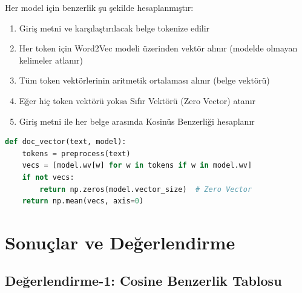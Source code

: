 \documentclass[12pt, a4paper]{article}
\begin{document}
Her model için benzerlik şu şekilde hesaplanmıştır:

\begin{enumerate}
    \item Giriş metni ve karşılaştırılacak belge tokenize edilir
    \item Her token için Word2Vec modeli üzerinden vektör alınır (modelde olmayan kelimeler atlanır)
    \item Tüm token vektörlerinin aritmetik ortalaması alınır (belge vektörü)
    \item Eğer hiç token vektörü yoksa Sıfır Vektörü (Zero Vector) atanır
    \item Giriş metni ile her belge arasında Kosinüs Benzerliği hesaplanır
\end{enumerate}

\begin{lstlisting}[style=kod, language=Python, caption={Belge Vektörü Hesaplama}]
def doc_vector(text, model):
    tokens = preprocess(text)
    vecs = [model.wv[w] for w in tokens if w in model.wv]
    if not vecs:
        return np.zeros(model.vector_size)  # Zero Vector
    return np.mean(vecs, axis=0)
\end{lstlisting}

\section{Sonuçlar ve Değerlendirme}

\subsection{Değerlendirme-1: Cosine Benzerlik Tablosu}
\end{document}
